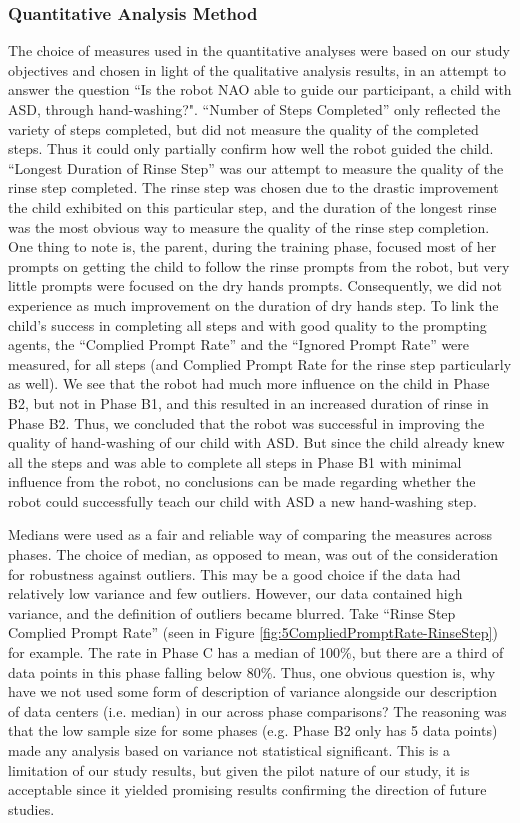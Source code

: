 \subsubsection{Quantitative Analysis Method}
The choice of measures used in the quantitative analyses were based on our study objectives and chosen in light of the qualitative analysis results, in an attempt to answer the question ``Is the robot NAO able to guide our participant, a child with ASD, through hand-washing?".  ``Number of Steps Completed'' only reflected the variety of steps completed, but did not measure the quality of the completed steps.  Thus it could only partially confirm how well the robot guided the child.  ``Longest Duration of Rinse Step'' was our attempt to measure the quality of the rinse step completed.  The rinse step was chosen due to the drastic improvement the child exhibited on this particular step, and the duration of the longest rinse was the most obvious way to measure the quality of the rinse step completion.  One thing to note is, the parent, during the training phase, focused most of her prompts on getting the child to follow the rinse prompts from the robot, but very little prompts were focused on the dry hands prompts.  Consequently, we did not experience as much improvement on the duration of dry hands step.  To link the child's success in completing all steps and with good quality to the prompting agents, the ``Complied Prompt Rate'' and the ``Ignored Prompt Rate'' were measured, for all steps (and Complied Prompt Rate for the rinse step particularly as well).  We see that the robot had much more influence on the child in Phase B2, but not in Phase B1, and this resulted in an increased duration of rinse in Phase B2.  Thus, we concluded that the robot was successful in improving the quality of hand-washing of our child with ASD.  But since the child already knew all the steps and was able to complete all steps in Phase B1 with minimal influence from the robot, no conclusions can be made regarding whether the robot could successfully teach our child with ASD a new hand-washing step.

Medians were used as a fair and reliable way of comparing the measures across phases.  The choice of median, as opposed to mean, was out of the consideration for robustness against outliers.  This may be a good choice if the data had relatively low variance and few outliers.  However, our data contained high variance, and the definition of outliers became blurred.  Take ``Rinse Step Complied Prompt Rate'' (seen in Figure \ref{fig:5CompliedPromptRate-RinseStep}) for example.  The rate in Phase C has a median of 100\%, but there are a third of data points in this phase falling below 80\%.  Thus, one obvious question is, why have we not used some form of description of variance alongside our description of data centers (i.e. median) in our across phase comparisons?  The reasoning was that the low sample size for some phases (e.g. Phase B2 only has 5 data points) made any analysis based on variance not statistical significant.  This is a limitation of our study results, but given the pilot nature of our study, it is acceptable since it yielded promising results confirming the direction of future studies.

